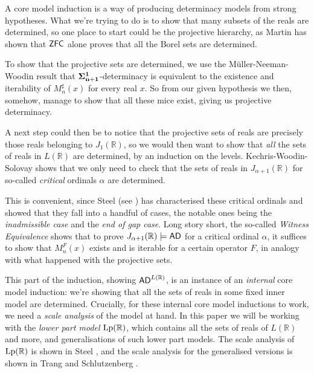 \documentclass[../../main]{subfiles}
\begin{document}
\qquad A core model induction is a way of producing determinacy models from strong hypotheses. What we're trying to do is to show that many subsets of the reals are determined, so one place to start could be the projective hierarchy, as Martin has shown that $\textsf{ZFC}$ alone proves that all the Borel sets are determined.

\qquad To show that the projective sets are determined, we use the M\" uller-Neeman-Woodin result that $\bf\Sigma^1_{n+1}$-determinacy is equivalent to the existence and iterability of $M_n^\sharp(x)$ for every real $x$. So from our given hypothesis we then, somehow, manage to show that all these mice exist, giving us projective determinacy.

\qquad A next step could then be to notice that the projective sets of reals are precisely those reals belonging to $J_1(\mathbb R)$, so we would then want to show that \textit{all} the sets of reals in $L(\mathbb R)$ are determined, by an induction on the levels. Kechris-Woodin-Solovay  shows that we only need to check that the sets of reals in $J_{\alpha+1}(\mathbb R)$ for so-called \textit{critical} ordinals $\alpha$ are determined.

\qquad This is convenient, since Steel (see \cite{scalesinL(R)}) has characterised these critical ordinals and showed that they fall into a handful of cases, the notable ones being the \textit{inadmissible case} and the \textit{end of gap case}. Long story short, the so-called \textit{Witness Equivalence} shows that to prove $J_{\alpha+1}(\mathbb R)\models\textsf{AD}$ for a critical ordinal $\alpha$, it suffices to show that $M_n^F(x)$ exists and is iterable for a certain operator $F$, in analogy with what happened with the projective sets.

\qquad This part of the induction, showing $\textsf{AD}^{L{(\mathbb R)}}$, is an instance of an \textit{internal} core model induction: we're showing that all the sets of reals in some fixed inner model are determined. Crucially, for these internal core model inductions to work, we need a \textit{scale analysis} of the model at hand. In this paper we will be working with the \textit{lower part model} $\operatorname{Lp}(\mathbb R)$, which contains all the sets of reals of $L(\mathbb R)$ and more, and generalisations of such lower part models. The scale analysis of $\operatorname{Lp}(\mathbb R)$ is shown in Steel , and the scale analysis for the generalised versions is shown in Trang and Schlutzenberg .
\end{document}
